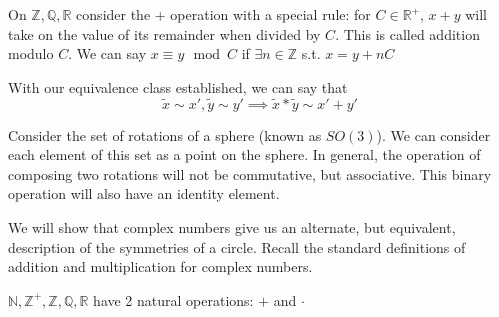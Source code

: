 \documentclass{report}
\begin{document}
\begin{example}
    On $\mathbb{Z}, \mathbb{Q}, \mathbb{R}$ consider the $+$ operation with a special rule: for $C \in \mathbb{R}^+$, $x + y$ will take on the value of its remainder when divided by $C$. This is called addition modulo $C$. We can say $x \equiv y \, \bmod C$ if $\exists n \in \mathbb{Z}$ s.t. $x = y + n C$
\end{example}

With our equivalence class established, we can say that
\begin{equation*}
    \tilde{x} \sim x', \tilde{y} \sim y' \implies \tilde{x} * \tilde{y} \sim x' + y'
\end{equation*}

\begin{example}
    Consider the set of rotations of a sphere (known as $SO(3)$). We can consider each element of this set as a point on the sphere. In general, the operation of composing two rotations will not be commutative, but associative. This binary operation will also have an identity element.
\end{example}

\begin{example}
    We will show that complex numbers give us an alternate, but equivalent, description of the symmetries of a circle. Recall the standard definitions of addition and multiplication for complex numbers. 

    \begin{remark}
        $\mathbb{N}, \mathbb{Z}^+, \mathbb{Z}, \mathbb{Q}, \mathbb{R}$ have 2 natural operations: $+$ and $\cdot$
    \end{remark}
\end{example}
\end{document}
